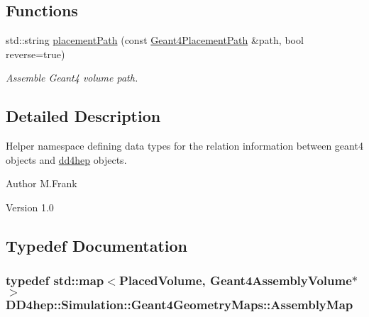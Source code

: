\subsection*{Functions}
\begin{DoxyCompactItemize}
\item 
std::string \hyperlink{namespace_d_d4hep_1_1_simulation_1_1_geant4_geometry_maps_af627f19c95eb3ca249c7464078af28dc}{placementPath} (const \hyperlink{namespace_d_d4hep_1_1_simulation_1_1_geant4_geometry_maps_a8a325934adb143cb1cbc47dd030395ed}{Geant4PlacementPath} \&path, bool reverse=true)
\begin{DoxyCompactList}\small\item\em Assemble Geant4 volume path. \item\end{DoxyCompactList}\end{DoxyCompactItemize}


\subsection{Detailed Description}
Helper namespace defining data types for the relation information between geant4 objects and \hyperlink{namespacedd4hep}{dd4hep} objects. \begin{DoxyAuthor}{Author}
M.Frank 
\end{DoxyAuthor}
\begin{DoxyVersion}{Version}
1.0 
\end{DoxyVersion}


\subsection{Typedef Documentation}
\hypertarget{namespace_d_d4hep_1_1_simulation_1_1_geant4_geometry_maps_ae1f67e315dd299b17e4ea1c58a47b312}{
\subsubsection[{AssemblyMap}]{\setlength{\rightskip}{0pt plus 5cm}typedef std::map$<$PlacedVolume, {\bf Geant4AssemblyVolume}$\ast$$>$ {\bf DD4hep::Simulation::Geant4GeometryMaps::AssemblyMap}}}
\label{namespace_d_d4hep_1_1_simulation_1_1_geant4_geometry_maps_ae1f67e315dd299b17e4ea1c58a47b312}


